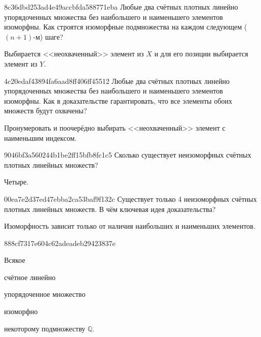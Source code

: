 \begin{note}{8c36dbd253ad4e49accbfda588771eba}
    Любые два счётных плотных линейно упорядоченных множества без наибольшего и наименьшего элементов изоморфны.
    Как строятся изоморфные подмножества на каждом следующем (\({ (n+1) }\)-м) шаге?

    \begin{cloze}{1}
        Выбирается <<неохваченный>> элемент из \({ X }\) и для его позиции выбирается элемент из \({ Y }\).
    \end{cloze}
\end{note}

\begin{note}{4c20edaf43894fa6aad8ff406ff45512}
    Любые два счётных плотных линейно упорядоченных множества без наибольшего и наименьшего элементов изоморфны.
    Как в доказательстве гарантировать, что все элементы обоих множеств будут охвачены?

    \begin{cloze}{1}
        Пронумеровать и поочерёдно выбирать <<неохваченный>> элемент с наименьшим индексом.
    \end{cloze}
\end{note}

\begin{note}{9046bf3a560244b1be2ff15bfb8fc1c5}
    Сколько существует неизоморфных счётных плотных линейных множеств?

    \begin{cloze}{1}
        Четыре.
    \end{cloze}
\end{note}

\begin{note}{00ea7e2d37ed47ebba2ca53baf9f132c}
    Существует только 4 неизоморфных счётных плотных линейных множеств.
    В чём ключевая идея доказательства?

    \begin{cloze}{1}
        Изоморфность зависит только от наличия наибольших и наименьших элементов.
    \end{cloze}
\end{note}

\begin{note}{888cf7317e604c62adeadeb29423837e}
    \begin{icloze}{4}Всякое\end{icloze} \begin{icloze}{3}счётное линейно\end{icloze} упорядоченное множество \begin{icloze}{2}изоморфно\end{icloze} \begin{icloze}{1}некоторому подмножеству \({ \mathbb Q }\).\end{icloze}
\end{note}


